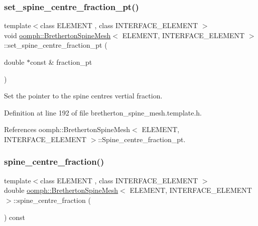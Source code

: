\subsubsection{\texorpdfstring{set\+\_\+spine\+\_\+centre\+\_\+fraction\+\_\+pt()}{set\_spine\_centre\_fraction\_pt()}}
{\footnotesize\ttfamily template$<$class E\+L\+E\+M\+E\+NT , class I\+N\+T\+E\+R\+F\+A\+C\+E\+\_\+\+E\+L\+E\+M\+E\+NT $>$ \\
void \hyperlink{classoomph_1_1BrethertonSpineMesh}{oomph\+::\+Bretherton\+Spine\+Mesh}$<$ E\+L\+E\+M\+E\+NT, I\+N\+T\+E\+R\+F\+A\+C\+E\+\_\+\+E\+L\+E\+M\+E\+NT $>$\+::set\+\_\+spine\+\_\+centre\+\_\+fraction\+\_\+pt (\begin{DoxyParamCaption}\item[{double $\ast$const \&}]{fraction\+\_\+pt }\end{DoxyParamCaption})\hspace{0.3cm}{\ttfamily [inline]}}



Set the pointer to the spine centre\textquotesingle{}s vertial fraction. 



Definition at line 192 of file bretherton\+\_\+spine\+\_\+mesh.\+template.\+h.



References oomph\+::\+Bretherton\+Spine\+Mesh$<$ E\+L\+E\+M\+E\+N\+T, I\+N\+T\+E\+R\+F\+A\+C\+E\+\_\+\+E\+L\+E\+M\+E\+N\+T $>$\+::\+Spine\+\_\+centre\+\_\+fraction\+\_\+pt.

\mbox{\label{classoomph_1_1BrethertonSpineMesh_a67f784e7b3a898af6c60515042c3ea73}} 
\subsubsection{\texorpdfstring{spine\+\_\+centre\+\_\+fraction()}{spine\_centre\_fraction()}}
{\footnotesize\ttfamily template$<$class E\+L\+E\+M\+E\+NT , class I\+N\+T\+E\+R\+F\+A\+C\+E\+\_\+\+E\+L\+E\+M\+E\+NT $>$ \\
double \hyperlink{classoomph_1_1BrethertonSpineMesh}{oomph\+::\+Bretherton\+Spine\+Mesh}$<$ E\+L\+E\+M\+E\+NT, I\+N\+T\+E\+R\+F\+A\+C\+E\+\_\+\+E\+L\+E\+M\+E\+NT $>$\+::spine\+\_\+centre\+\_\+fraction (\begin{DoxyParamCaption}{ }\end{DoxyParamCaption}) const\hspace{0.3cm}{\ttfamily [inline]}}



